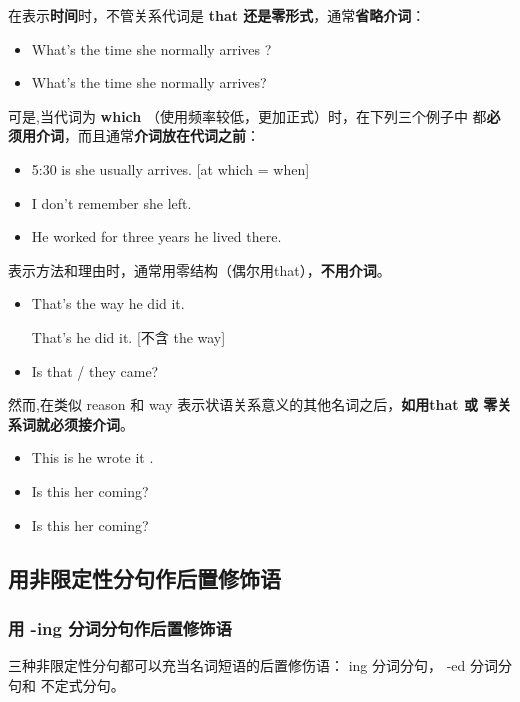 在表示\textbf{时间}时，不管关系代词是 \textbf{that 还是零形式}，通常\textbf{省略介词}：
\begin{itemize}
\item What's the time  she normally arrives ?
\item What's the time  she normally arrives?
\end{itemize}
可是,当代词为 \textbf{which} （使用频率较低，更加正式）时，在下列三个例子中
都\textbf{必须用介词}，而且通常\textbf{介词放在代词之前}：
\begin{itemize}
\item 5:30 is  she usually arrives. [at which =
  when]
\item I don't remember  she left.

\item He worked for three years  he lived there.
\end{itemize}
表示方法和理由时，通常用零结构（偶尔用that），\textbf{不用介词}。
\begin{itemize}
\item That's the way  he did it.

  That's  he did it. [不含 the way]


\item Is that / they came?
\end{itemize}
然而,在类似 reason 和 way 表示状语关系意义的其他名词之后，\textbf{如用that 或
  零关系词就必须接介词}。
\begin{itemize}
\item This is  he wrote it .

\item Is this  her coming?
\item Is this  her coming?
\end{itemize}



\subsection{用非限定性分句作后置修饰语}

\subsubsection{用 -ing 分词分句作后置修饰语}

三种非限定性分句都可以充当名词短语的后置修伤语： ing 分词分句， -ed 分词分句和
不定式分句。


